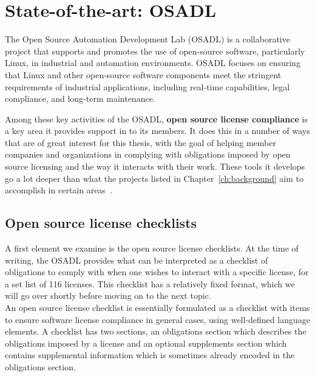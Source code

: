 
\chapter{State-of-the-art: OSADL}\label{ch:related-work}


The Open Source Automation Development Lab (OSADL) is a collaborative project that supports and promotes the use of open-source software, particularly Linux, in industrial and automation environments. OSADL focuses on ensuring that Linux and other open-source software components meet the stringent requirements of industrial applications, including real-time capabilities, legal compliance, and long-term maintenance.

Among these key activities of the OSADL, \textbf{open source license compliance} is a key area it provides support in to its members. It does this in a number of ways that are of great interest for this thesis, with the goal of helping member companies and organizations in complying with obligations imposed by open source licensing and the way it interacts with their work. These tools it develops go a lot deeper than what the projects listed in Chapter~\ref{ch:background} aim to accomplish in certain areas~\cite{osadl-home}.

\section{Open source license checklists}

A first element we examine is the open source license checklists. At the time of writing, the OSADL provides what can be interpreted as a checklist of obligations to comply with when one wishes to interact with a specific license, for a set list of 116 licenses. This checklist has a relatively fixed format, which we will go over shortly before moving on to the next topic. \\

An open source license checklist is essentially formulated as a checklist with items to ensure software license compliance in general cases, using well-defined language elements. A checklist has two sections, an obligations section which describes the obligations imposed by a license and an optional supplements section which contains supplemental information which is sometimes already encoded in the obligations section.

